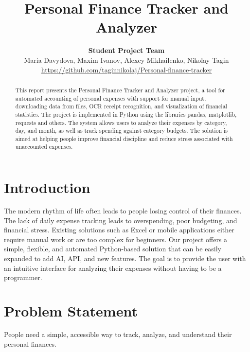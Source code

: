 \documentclass[conference]{IEEEtran}
\begin{document}
\title{Personal Finance Tracker and Analyzer}

\author{%
\textbf{Student Project Team}\\
Maria Davydova, Maxim Ivanov, Alexey Mikhailenko, Nikolay Tagin\\
\href{https://github.com/taginnikolaj/Personal-finance-tracker}{\textcolor{linkblue}{\uline{https://github.com/taginnikolaj/Personal-finance-tracker}}}%
}

\maketitle

\begin{abstract}
This report presents the Personal Finance Tracker and Analyzer project, a tool for automated accounting of personal expenses with support for manual input, downloading data from files, OCR receipt recognition, and visualization of financial statistics. The project is implemented in Python using the libraries pandas, matplotlib, requests and others. The system allows users to analyze their expenses by category, day, and month, as well as track spending against category budgets. The solution is aimed at helping people improve financial discipline and reduce stress associated with unaccounted expenses.
\end{abstract}

\section{Introduction}
The modern rhythm of life often leads to people losing control of their finances. The lack of daily expense tracking leads to overspending, poor budgeting, and financial stress. Existing solutions such as Excel or mobile applications either require manual work or are too complex for beginners. Our project offers a simple, flexible, and automated Python-based solution that can be easily expanded to add AI, API, and new features. The goal is to provide the user with an intuitive interface for analyzing their expenses without having to be a programmer.

\section{Problem Statement}
People need a simple, accessible way to track, analyze, and understand their personal finances.
\end{document}
